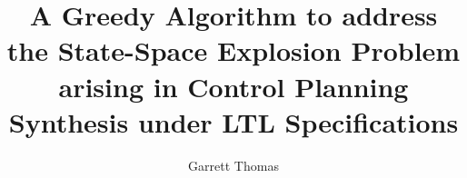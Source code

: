 \documentclass[12pt,a4paper]{report}
\title{A Greedy Algorithm to address the State-Space Explosion Problem arising in Control Planning Synthesis under LTL Specifications}
\author{Garrett Thomas}
\begin{document}
\renewcommand{\thepage}{\roman{page}}
\thispagestyle{empty}

\newpage
\tableofcontents
\newpage
\listoffigures
\newpage
\FloatBarrier

\newpage
\FloatBarrier

\newpage
\FloatBarrier
\setcounter{page}{1}
\renewcommand{\thepage}{\arabic{page}}

\newpage
\FloatBarrier

\newpage
\FloatBarrier

\newpage
\FloatBarrier

\newpage
\FloatBarrier

\newpage
\FloatBarrier

\newpage
\FloatBarrier



\newpage
\FloatBarrier


\end{document}
